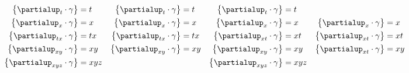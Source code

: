 \documentclass[\ifafour a4paper,12pt,\else a5paper,10pt,\fi%
onecolumn,oneside,article,%
british%
]{memoir}
\makeatletter
\theoremstyle{remark}
\theoremstyle{innote}
\def\sum{\DOTSI\sumop\slimits@}
\newcommand*{\de}{\partialup}%
\DeclarePairedDelimiter\set{\{}{\}} %
\newcommand*{\p}{\mathrm{p}}%
\renewcommand*{\|}[1][]{\nonscript\:#1\vert\nonscript\:\mathopen{}}
\newcommand*{\tsum}{\mathop{\textstyle\sum}\nolimits}
\makeatother
\begin{document}
\begin{equation}
\begin{aligned}
    \set[\big]{\de_{t}\cdot\gamma} &= t &
    \set[\big]{\de_{t}\cdot\gamma} &= t &
    \set[\big]{\de_{t}\cdot\gamma} &= t 
\\
    \set[\big]{\de_{x}\cdot\gamma} &= x &
    \set[\big]{\de_{x}\cdot\gamma} &= x &
    \set[\big]{\de_{x}\cdot\gamma} &= x &
    \set[\big]{\de_{x}\cdot\gamma} &= x 
\\
    \set[\big]{\de_{tx}\cdot\gamma} &= tx &
    \set[\big]{\de_{tx}\cdot\gamma} &= tx &
    \set[\big]{\de_{xt}\cdot\gamma} &= xt &
    \set[\big]{\de_{xt}\cdot\gamma} &= xt 
\\
    \set[\big]{\de_{xy}\cdot\gamma} &= xy &
    \set[\big]{\de_{xy}\cdot\gamma} &= xy &
    \set[\big]{\de_{xy}\cdot\gamma} &= xy &
    \set[\big]{\de_{xt}\cdot\gamma} &= xy 
\\
    \set[\big]{\de_{xyz}\cdot\gamma} &= xyz & & &
    \set[\big]{\de_{xyz}\cdot\gamma} &= xyz & & 
  \end{aligned}
\end{equation}
\fi





\end{document}
